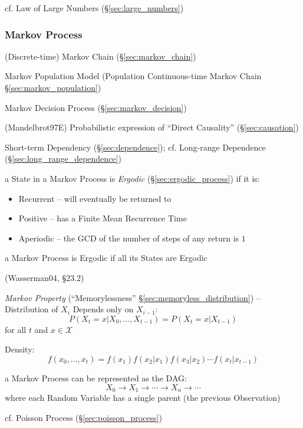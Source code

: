cf. Law of Large Numbers (\S\ref{sec:large_numbers})



\subsubsection{Markov Process}\label{sec:markov_process}


\fist (Discrete-time) Markov Chain (\S\ref{sec:markov_chain})

\fist Markov Population Model (Population Continuous-time Markov Chain
\S\ref{sec:markov_population})

\fist Markov Decision Process (\S\ref{sec:markov_decision})

(Mandelbrot97E) Probabilistic expression of ``Direct Causality''
(\S\ref{sec:causation})

Short-term Dependency (\S\ref{sec:dependence}); cf. Long-range Dependence
(\S\ref{sec:long_range_dependence})

a State in a Markov Process is \emph{Ergodic} (\S\ref{sec:ergodic_process}) if
it is:
\begin{itemize}
  \item Recurrent -- will eventually be returned to
  \item Positive -- has a Finite Mean Recurrence Time
  \item Aperiodic -- the GCD of the number of steps of any return is $1$
\end{itemize}
a Markov Process is Ergodic if all its States are Ergodic


(Wasserman04, \S23.2)

\emph{Markov Property} (``Memorylessness'' \S\ref{sec:memoryless_distribution})
-- Distribution of $X_i$ Depends only on $X_{i-1}$:
\[
  P(X_t = x | X_0, \ldots, X_{t-1}) = P(X_t = x | X_{t-1})
\]
for all $t$ and $x \in \mathcal{X}$

Density:
\[
  f(x_0, \ldots, x_t) = f(x_1)f(x_2|x_1)f(x_3|x_2) \cdots f(x_t|x_{t-1})
\]

a Markov Process can be represented as the DAG:
\[
  X_0 \longrightarrow X_1 \longrightarrow \cdots \longrightarrow X_n
    \longrightarrow \cdots
\]
where each Random Variable has a single parent (the previous Observation)

cf. Poisson Process (\S\ref{sec:poisson_process})

